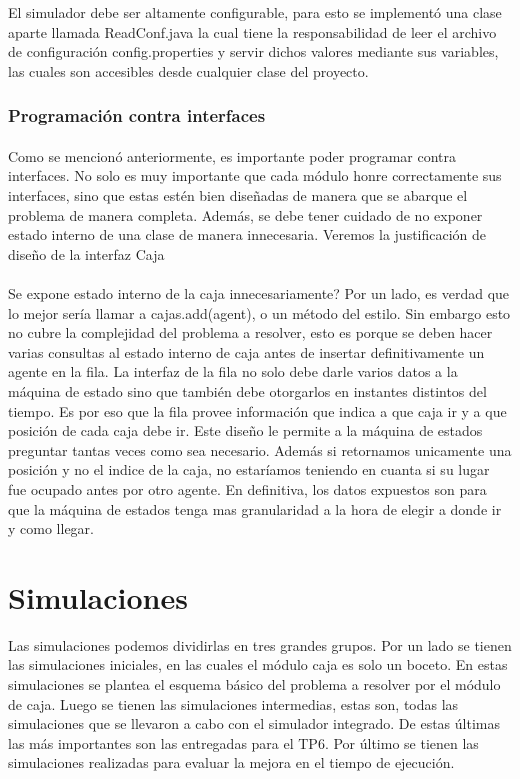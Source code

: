 \documentclass{article}
\begin{document}
El simulador debe ser altamente configurable, para esto se implementó una clase aparte llamada ReadConf.java la cual tiene la responsabilidad de leer el archivo de configuración config.properties y servir dichos valores mediante sus variables, las cuales son accesibles desde cualquier clase del proyecto.

\subsubsection{Programación contra interfaces}

\paragraph{}
Como se mencionó anteriormente, es importante poder programar contra interfaces. No solo es muy importante que cada módulo honre correctamente sus interfaces, sino que estas estén bien diseñadas de manera que se abarque el problema de manera completa. Además, se debe tener cuidado de no exponer estado interno de una clase de manera innecesaria. Veremos la justificación de diseño de la interfaz Caja

\paragraph{}
Se expone estado interno de la caja innecesariamente? Por un lado, es verdad que lo mejor sería llamar a cajas.add(agent), o un método del estilo. Sin embargo esto no cubre la complejidad del problema a resolver, esto es porque se deben hacer varias consultas al estado interno de caja antes de insertar definitivamente un agente en la fila. La interfaz de la fila no solo debe darle varios datos a la máquina de estado sino que también debe otorgarlos en instantes distintos del tiempo. Es por eso que la fila provee información que indica a que caja ir y a que posición de cada caja debe ir. Este diseño le permite a la máquina de estados preguntar tantas veces como sea necesario. Además si retornamos unicamente una posición y no el indice de la caja, no estaríamos teniendo en cuanta si su lugar fue ocupado antes por otro agente. En definitiva, los datos expuestos son para que la máquina de estados tenga mas granularidad a la hora de elegir a donde ir y como llegar.

\section{Simulaciones}
Las simulaciones podemos dividirlas en tres grandes grupos. Por un lado se tienen las simulaciones iniciales, en las cuales el módulo caja es solo un boceto. En estas simulaciones se plantea el esquema básico del problema a resolver por el módulo de caja.
Luego se tienen las simulaciones intermedias, estas son, todas las simulaciones que se llevaron a cabo con el simulador integrado. De estas últimas las más importantes son las entregadas para el TP6. Por último se tienen las simulaciones realizadas para evaluar
la mejora en el tiempo de ejecución.
\end{document}
